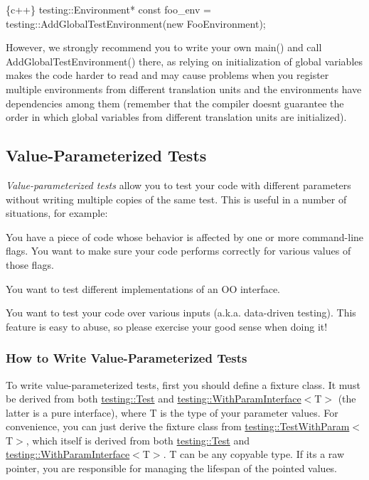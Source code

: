 \begin{DoxyCode}
\{c++\}
testing::Environment* const foo\_env =
    testing::AddGlobalTestEnvironment(new FooEnvironment);
\end{DoxyCode}


However, we strongly recommend you to write your own {\ttfamily main()} and call {\ttfamily Add\+Global\+Test\+Environment()} there, as relying on initialization of global variables makes the code harder to read and may cause problems when you register multiple environments from different translation units and the environments have dependencies among them (remember that the compiler doesn\textquotesingle{}t guarantee the order in which global variables from different translation units are initialized).

\subsection*{Value-\/\+Parameterized Tests}

{\itshape Value-\/parameterized tests} allow you to test your code with different parameters without writing multiple copies of the same test. This is useful in a number of situations, for example\+:


\begin{DoxyItemize}
\item You have a piece of code whose behavior is affected by one or more command-\/line flags. You want to make sure your code performs correctly for various values of those flags.
\item You want to test different implementations of an OO interface.
\item You want to test your code over various inputs (a.\+k.\+a. data-\/driven testing). This feature is easy to abuse, so please exercise your good sense when doing it!
\end{DoxyItemize}

\subsubsection*{How to Write Value-\/\+Parameterized Tests}

To write value-\/parameterized tests, first you should define a fixture class. It must be derived from both {\ttfamily \mbox{\hyperlink{classtesting_1_1Test}{testing\+::\+Test}}} and {\ttfamily \mbox{\hyperlink{classtesting_1_1WithParamInterface}{testing\+::\+With\+Param\+Interface}}$<$T$>$} (the latter is a pure interface), where {\ttfamily T} is the type of your parameter values. For convenience, you can just derive the fixture class from {\ttfamily \mbox{\hyperlink{classtesting_1_1TestWithParam}{testing\+::\+Test\+With\+Param}}$<$T$>$}, which itself is derived from both {\ttfamily \mbox{\hyperlink{classtesting_1_1Test}{testing\+::\+Test}}} and {\ttfamily \mbox{\hyperlink{classtesting_1_1WithParamInterface}{testing\+::\+With\+Param\+Interface}}$<$T$>$}. {\ttfamily T} can be any copyable type. If it\textquotesingle{}s a raw pointer, you are responsible for managing the lifespan of the pointed values.

